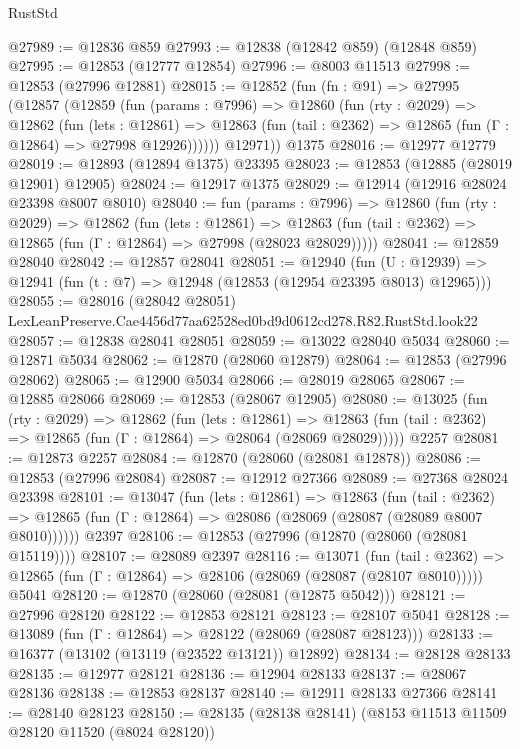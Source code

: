 \begin{lexlean}{RustStd}
\begin{coremodule}
@27989 := @12836 @859
@27993 := @12838 (@12842 @859) (@12848 @859)
@27995 := @12853 (@12777 @12854)
@27996 := @8003 @11513
@27998 := @12853 (@27996 @12881)
@28015 := @12852
    (fun (fn : @91) =>
    @27995
      (@12857
        (@12859
          (fun (params : @7996) =>
          @12860
            (fun (rty : @2029) =>
            @12862
              (fun (lets : @12861) =>
              @12863 (fun (tail : @2362) => @12865 (fun (Γ : @12864) => @27998 @12926))))))
        @12971))
    @1375
@28016 := @12977 @12779
@28019 := @12893 (@12894 @1375) @23395
@28023 := @12853 (@12885 (@28019 @12901) @12905)
@28024 := @12917 @1375
@28029 := @12914 (@12916 @28024 @23398 @8007 @8010)
@28040 := fun (params : @7996) =>
  @12860
    (fun (rty : @2029) =>
    @12862
      (fun (lets : @12861) =>
      @12863 (fun (tail : @2362) => @12865 (fun (Γ : @12864) => @27998 (@28023 @28029)))))
@28041 := @12859 @28040
@28042 := @12857 @28041
@28051 := @12940
    (fun (U : @12939) => @12941 (fun (t : @7) => @12948 (@12853 (@12954 @23395 @8013) @12965)))
@28055 := @28016
    (@28042 @28051)
    LexLeanPreserve.Cae4456d77aa62528ed0bd9d0612cd278.R82.RustStd.look22
@28057 := @12838 @28041 @28051
@28059 := @13022 @28040 @5034
@28060 := @12871 @5034
@28062 := @12870 (@28060 @12879)
@28064 := @12853 (@27996 @28062)
@28065 := @12900 @5034
@28066 := @28019 @28065
@28067 := @12885 @28066
@28069 := @12853 (@28067 @12905)
@28080 := @13025
    (fun (rty : @2029) =>
    @12862
      (fun (lets : @12861) =>
      @12863 (fun (tail : @2362) => @12865 (fun (Γ : @12864) => @28064 (@28069 @28029)))))
    @2257
@28081 := @12873 @2257
@28084 := @12870 (@28060 (@28081 @12878))
@28086 := @12853 (@27996 @28084)
@28087 := @12912 @27366
@28089 := @27368 @28024 @23398
@28101 := @13047
    (fun (lets : @12861) =>
    @12863
      (fun (tail : @2362) =>
      @12865 (fun (Γ : @12864) => @28086 (@28069 (@28087 (@28089 @8007 @8010))))))
    @2397
@28106 := @12853 (@27996 (@12870 (@28060 (@28081 @15119))))
@28107 := @28089 @2397
@28116 := @13071
    (fun (tail : @2362) => @12865 (fun (Γ : @12864) => @28106 (@28069 (@28087 (@28107 @8010)))))
    @5041
@28120 := @12870 (@28060 (@28081 (@12875 @5042)))
@28121 := @27996 @28120
@28122 := @12853 @28121
@28123 := @28107 @5041
@28128 := @13089 (fun (Γ : @12864) => @28122 (@28069 (@28087 @28123)))
@28133 := @16377 (@13102 (@13119 (@23522 @13121)) @12892)
@28134 := @28128 @28133
@28135 := @12977 @28121
@28136 := @12904 @28133
@28137 := @28067 @28136
@28138 := @12853 @28137
@28140 := @12911 @28133 @27366
@28141 := @28140 @28123
@28150 := @28135 (@28138 @28141) (@8153 @11513 @11509 @28120 @11520 (@8024 @28120))

\end{coremodule}
\end{lexlean}

